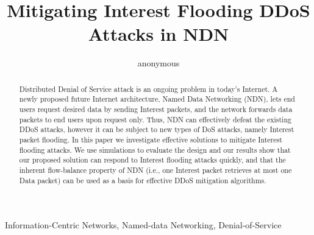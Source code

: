 \documentclass[conference]{IEEEtran}
\title{Mitigating Interest Flooding DDoS Attacks in NDN}%
\author{anonymous}
\begin{document}
\maketitle

\begin{abstract}

Distributed Denial of Service attack is an ongoing problem in today's Internet. 
A newly proposed future Internet architecture, Named Data Networking (NDN), lets end users request desired data by sending Interest packets, and the network forwards data packets to end users upon request only. 
Thus, NDN can effectively defeat the existing DDoS attacks, however it can be subject to new types of DoS attacks, namely Interest packet flooding.  
In this paper we investigate effective solutions to mitigate Interest flooding attacks. 
We use simulations to evaluate the design and our results show that our proposed solution can respond to Interest flooding attacks quickly, and that the inherent flow-balance property of NDN (i.e., one Interest packet retrieves at most one Data packet) can be used as a basis for effective DDoS mitigation algorithms.

\end{abstract}

\begin{IEEEkeywords}
Information-Centric Networks, Named-data Networking, Denial-of-Service
\end{IEEEkeywords}




















\end{document}
